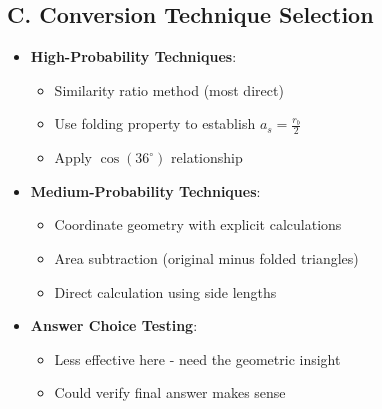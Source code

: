 \documentclass[12pt]{article}
\begin{document}
\begin{tacticalbox}
\subsection*{C. Conversion Technique Selection}
\begin{itemize}[leftmargin=*]
    \item \textbf{High-Probability Techniques}:
    \begin{itemize}
        \item Similarity ratio method (most direct)
        \item Use folding property to establish $a_s = \frac{r_b}{2}$
        \item Apply $\cos(36^\circ)$ relationship
    \end{itemize}
    \item \textbf{Medium-Probability Techniques}:
    \begin{itemize}
        \item Coordinate geometry with explicit calculations
        \item Area subtraction (original minus folded triangles)
        \item Direct calculation using side lengths
    \end{itemize}
    \item \textbf{Answer Choice Testing}:
    \begin{itemize}
        \item Less effective here - need the geometric insight
        \item Could verify final answer makes sense
    \end{itemize}
\end{itemize}
\end{tacticalbox}
\end{document}
